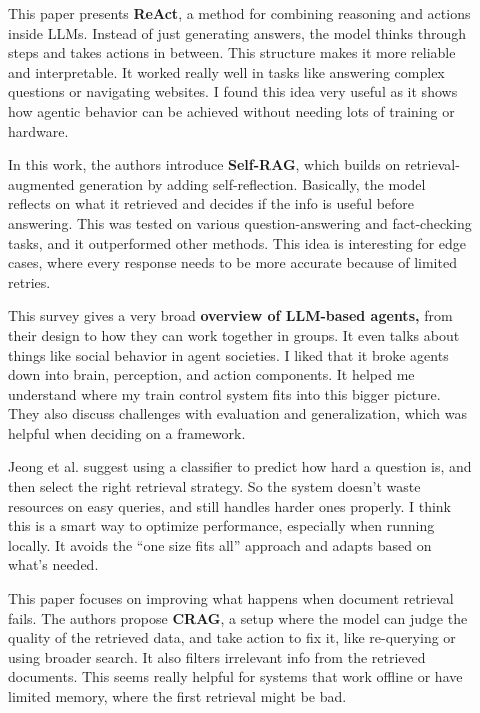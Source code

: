 \begin{description} 
\item[\cite{yao_react_2023}]
This paper presents \textbf{ReAct}, a method for combining reasoning and actions inside LLMs. Instead of just generating answers, the model thinks through steps and takes actions in between. This structure makes it more reliable and interpretable. It worked really well in tasks like answering complex questions or navigating websites. I found this idea very useful as it shows how agentic behavior can be achieved without needing lots of training or hardware.

\item[\cite{asai_self-rag_2023}]
In this work, the authors introduce \textbf{Self-RAG}, which builds on retrieval-augmented generation by adding self-reflection. Basically, the model reflects on what it retrieved and decides if the info is useful before answering. This was tested on various question-answering and fact-checking tasks, and it outperformed other methods. This idea is interesting for edge cases, where every response needs to be more accurate because of limited retries.

\item[\cite{xi_rise_2023}]
This survey gives a very broad \textbf{overview of LLM-based agents,} from their design to how they can work together in groups. It even talks about things like social behavior in agent societies. I liked that it broke agents down into brain, perception, and action components. It helped me understand where my train control system fits into this bigger picture. They also discuss challenges with evaluation and generalization, which was helpful when deciding on a framework.

\item[\cite{jeong_adaptive-rag_2024}]
Jeong et al. suggest using a classifier to predict how hard a question is, and then select the right retrieval strategy. So the system doesn't waste resources on easy queries, and still handles harder ones properly. I think this is a smart way to optimize performance, especially when running locally. It avoids the “one size fits all” approach and adapts based on what’s needed.

\item[\cite{yan_corrective_2024}]
This paper focuses on improving what happens when document retrieval fails. The authors propose \textbf{CRAG}, a setup where the model can judge the quality of the retrieved data, and take action to fix it, like re-querying or using broader search. It also filters irrelevant info from the retrieved documents. This seems really helpful for systems that work offline or have limited memory, where the first retrieval might be bad.


\end{description}
